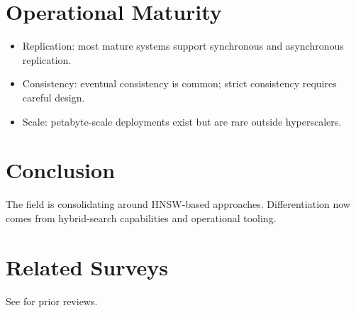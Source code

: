 \documentclass{article}
\begin{document}
\section{Operational Maturity}

\begin{itemize}
  \item Replication: most mature systems support synchronous and asynchronous replication.
  \item Consistency: eventual consistency is common; strict consistency requires careful design.
  \item Scale: petabyte-scale deployments exist but are rare outside hyperscalers.
\end{itemize}

\section{Conclusion}
The field is consolidating around HNSW-based approaches. Differentiation now comes from hybrid-search capabilities and operational tooling.

\section*{Related Surveys}
See \cite{survey2022,survey2023,survey2024} for prior reviews.



\end{document}
